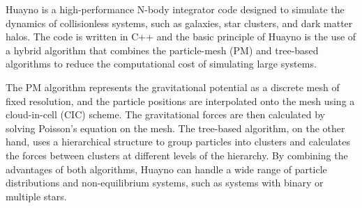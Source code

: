 Huayno \citep{pelupessy2012n} is a high-performance N-body integrator code designed to simulate the dynamics of collisionless systems, such as galaxies, star clusters, and dark matter halos. The code is written in C++ and the basic principle of Huayno is the use of a hybrid algorithm \citep{bode2000tree} that combines the particle-mesh (PM) \citep{klypin1983three} and tree-based algorithms \citep{barnes1986hierarchical,dehnen2000very} to reduce the computational cost of simulating large systems.


The PM algorithm represents the gravitational potential as a discrete mesh of fixed resolution, and the particle positions are interpolated onto the mesh using a cloud-in-cell (CIC) scheme. The gravitational forces are then calculated by solving Poisson's equation on the mesh. The tree-based algorithm, on the other hand, uses a hierarchical structure to group particles into clusters and calculates the forces between clusters at different levels of the hierarchy. By combining the advantages of both algorithms, Huayno can handle a wide range of particle distributions and non-equilibrium systems, such as systems with binary or multiple stars.




